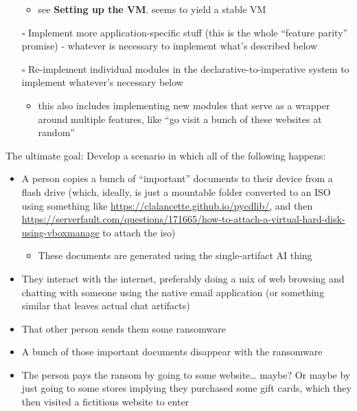 \begin{itemize}
  \begin{itemize}
  \tightlist
  \item
    see \textbf{Setting up the VM}. seems to yield a stable VM
  \end{itemize}
\item[$\square$]
  Implement more application-specific stuff (this is the whole ``feature
  parity'' promise) - whatever is necessary to implement what's
  described below
\item[$\square$]
  Re-implement individual modules in the declarative-to-imperative
  system to implement whatever's necessary below

  \begin{itemize}
  \tightlist
  \item
    this also includes implementing new modules that serve as a wrapper
    around multiple features, like ``go visit a bunch of these websites
    at random''
  \end{itemize}
\end{itemize}

The ultimate goal: Develop a scenario in which all of the following
happens:

\begin{itemize}
\tightlist
\item
  A person copies a bunch of ``important'' documents to their device
  from a flash drive (which, ideally, is just a mountable folder
  converted to an ISO using something like
  \url{https://clalancette.github.io/pycdlib/,} and then
  \url{https://serverfault.com/questions/171665/how-to-attach-a-virtual-hard-disk-using-vboxmanage}
  to attach the iso)

  \begin{itemize}
  \tightlist
  \item
    These documents are generated using the single-artifact AI thing
  \end{itemize}
\item
  They interact with the internet, preferably doing a mix of web
  browsing and chatting with someone using the native email application
  (or something similar that leaves actual chat artifacts)
\item
  That other person sends them some ransomware
\item
  A bunch of those important documents disappear with the ransomware
\item
  The person pays the ransom by going to some website\ldots{} maybe? Or
  maybe by just going to some stores implying they purchased some gift
  cards, which they then visited a fictitious website to enter
\end{itemize}

